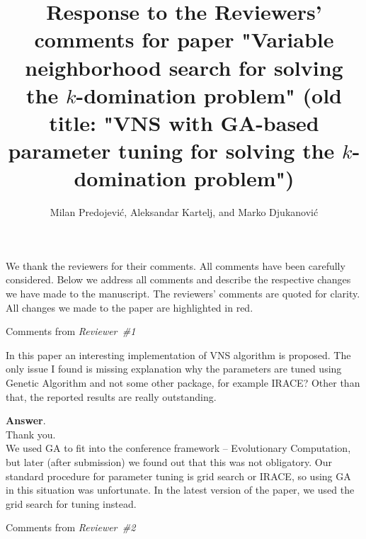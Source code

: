 \documentclass [11pt]{scrartcl}
\title{\Large{Response to the Reviewers' comments for paper "Variable neighborhood search for solving the $k$-domination problem" (old title: "VNS with GA-based parameter tuning for solving the $k$-domination problem")} }
\author{{Milan Predojević}, {Aleksandar Kartelj}, and {Marko Djukanović} }
\begin{document}
\maketitle 

We thank the reviewers for their   comments. All comments have been carefully considered. Below we address all comments and describe the respective changes we have made to the manuscript. The reviewers' comments are quoted for clarity. All changes we made to the paper are highlighted in red.
  
\begin{center} 
Comments from \textit{Reviewer\ \#1}
\end{center}

\begin{leftbar}

In this paper an interesting implementation of VNS algorithm is proposed. The only issue I found is missing explanation why the parameters are tuned using Genetic Algorithm and not some other package, for example IRACE? Other than that, the reported results are really outstanding.

\end{leftbar}
\textbf{Answer}. \\
 Thank you. \\
We used GA to fit into the conference framework -- Evolutionary Computation, but later (after submission) we found out that this was not obligatory. 
Our standard procedure for parameter tuning is grid search or IRACE, so using GA in this situation was unfortunate. In the latest version of the paper, we used the grid search for tuning instead.
 
\begin{center} 
	Comments from \textit{Reviewer\ \#2}
\end{center}
\end{document}
